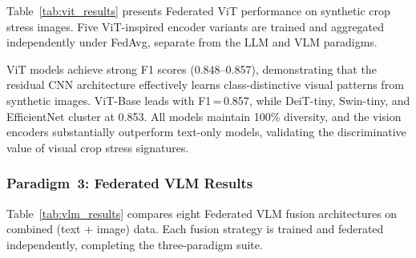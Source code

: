 \documentclass[10pt,journal,compsoc]{IEEEtran}
\begin{document}
Table~\ref{tab:vit_results} presents Federated ViT performance on synthetic crop stress images. Five ViT-inspired encoder variants are trained and aggregated independently under FedAvg, separate from the LLM and VLM paradigms.

\begin{table}[htbp]
\centering
\caption{ViT Encoder Performance (Synthetic Images)}
\label{tab:vit_results}
\small
{}
\end{table}

ViT models achieve strong F1 scores (0.848--0.857), demonstrating that the residual CNN architecture effectively learns class-distinctive visual patterns from synthetic images. ViT-Base leads with F1\,=\,0.857, while DeiT-tiny, Swin-tiny, and EfficientNet cluster at 0.853. All models maintain 100\% diversity, and the vision encoders substantially outperform text-only models, validating the discriminative value of visual crop stress signatures.

\subsubsection{Paradigm~3: Federated VLM Results}

Table~\ref{tab:vlm_results} compares eight Federated VLM fusion architectures on combined (text + image) data. Each fusion strategy is trained and federated independently, completing the three-paradigm suite.
\end{document}
